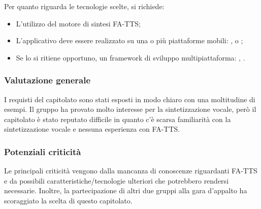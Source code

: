\documentclass[a4paper, titlepage]{article}
\begin{document}
Per quanto riguarda le tecnologie scelte, si richiede:
\begin{itemize}
	\item L'utilizzo del motore di sintesi FA-TTS;
	\item L'applicativo deve essere realizzato su una o più piattaforme mobili: ,  o ;
	\item Se lo si ritiene opportuno, un framework di sviluppo multipiattaforma: , .
\end{itemize}

\subsubsection{Valutazione generale}

I requisti del capitolato sono stati esposti in modo chiaro con una moltitudine di esempi.
Il gruppo ha provato molto interesse per la sintetizzazione vocale, però il capitolato è stato reputato difficile in quanto c'è scarsa familiarità con la sintetizzazione vocale e nessuna esperienza con FA-TTS.

\subsubsection{Potenziali criticità}
Le principali criticità vengono dalla mancanza di conoscenze riguardanti FA-TTS e da possibili caratteristiche/tecnologie ulteriori che potrebbero rendersi necessarie. Inoltre, la partecipazione di altri due gruppi alla gara d'appalto ha scoraggiato la scelta di questo capitolato.
\end{document}
